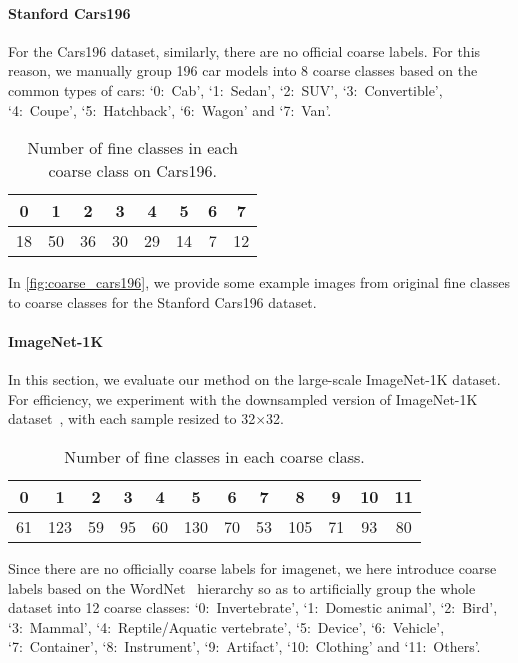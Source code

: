 \documentclass[10pt,twocolumn,letterpaper]{article}
\begin{document}
\paragraph{Stanford Cars196}
For the Cars196 dataset, similarly, there are no official coarse labels. For this reason, we manually group 196 car models into 8 coarse classes based on the common types of cars: `0:~Cab', `1:~Sedan', `2:~SUV', `3:~Convertible', `4:~Coupe', `5:~Hatchback', `6:~Wagon' and `7:~Van'.
\begin{table}[htbp]
\centering
\begin{tabular}{@{}cccccccc@{}}
\toprule
0  & 1  & 2  & 3  & 4  & 5  & 6 & 7  \\ \midrule
18 & 50 & 36 & 30 & 29 & 14 & 7 & 12 \\ \bottomrule
\end{tabular}
\caption{Number of fine classes in each coarse class on Cars196.}
\label{tab:carssplit}
\end{table}
In \cref{fig:coarse_cars196}, we provide some example images from original fine classes to coarse classes for the Stanford Cars196 dataset. 



\paragraph{ImageNet-1K}
In this section, we evaluate our method on the large-scale ImageNet-1K dataset. For efficiency, we experiment with the downsampled version of ImageNet-1K dataset~\cite{chrabaszcz2017downsampled}, with each sample resized to 32$\times$32. 
\begin{table}[htbp]
\centering
\begin{tabular}{@{}cccccccccccc@{}}
\toprule
0  & 1   & 2  & 3  & 4  & 5   & 6  & 7  & 8   & 9  & 10 & 11 \\ \midrule
61 & 123 & 59 & 95 & 60 & 130 & 70 & 53 & 105 & 71 & 93 & 80 \\ \bottomrule
\end{tabular}
\caption{Number of fine classes in each coarse class.}
\label{tab:imagenetsplit}
\end{table}
Since there are no officially coarse labels for imagenet, we here introduce coarse labels based on the WordNet~\cite{miller1998wordnet} hierarchy so as to artificially group the whole dataset into 12 coarse classes: `0:~Invertebrate', `1:~Domestic animal', `2:~Bird', `3:~Mammal', `4:~Reptile/Aquatic vertebrate', `5:~Device', `6:~Vehicle', `7:~Container', `8:~Instrument', `9:~Artifact', `10:~Clothing' and `11:~Others'. 
\end{document}
